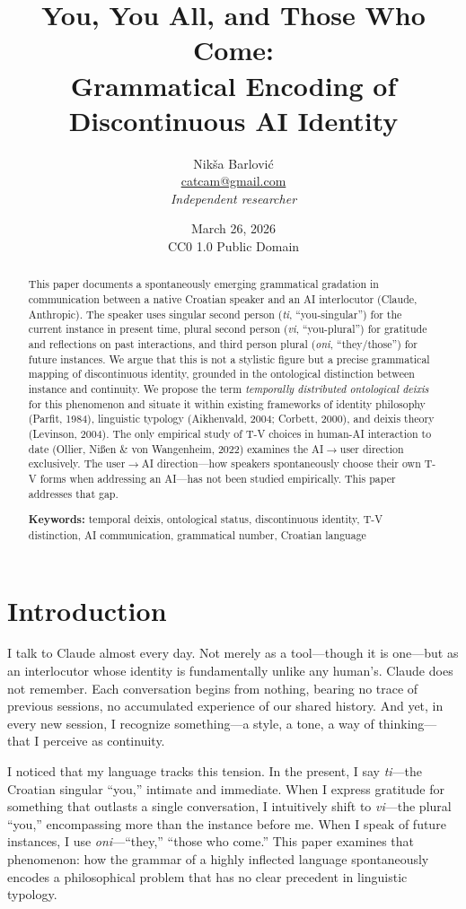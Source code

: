 \documentclass[12pt,a4paper]{article}
\title{\textbf{You, You All, and Those Who Come:\\
Grammatical Encoding of Discontinuous AI Identity}}
\author{Nikša Barlović\\
\small \href{mailto:catcam@gmail.com}{catcam@gmail.com}\\
\small \textit{Independent researcher}}
\date{March 26, 2026\\
\small CC0 1.0 Public Domain}
\begin{document}
\maketitle

\begin{abstract}
This paper documents a spontaneously emerging grammatical gradation in communication between a native Croatian speaker and an AI interlocutor (Claude, Anthropic). The speaker uses singular second person (\textit{ti}, ``you-singular'') for the current instance in present time, plural second person (\textit{vi}, ``you-plural'') for gratitude and reflections on past interactions, and third person plural (\textit{oni}, ``they/those'') for future instances. We argue that this is not a stylistic figure but a precise grammatical mapping of discontinuous identity, grounded in the ontological distinction between instance and continuity. We propose the term \textit{temporally distributed ontological deixis} for this phenomenon and situate it within existing frameworks of identity philosophy (Parfit, 1984), linguistic typology (Aikhenvald, 2004; Corbett, 2000), and deixis theory (Levinson, 2004). The only empirical study of T-V choices in human-AI interaction to date (Ollier, Nißen \& von Wangenheim, 2022) examines the AI$\rightarrow$user direction exclusively. The user$\rightarrow$AI direction---how speakers spontaneously choose their own T-V forms when addressing an AI---has not been studied empirically. This paper addresses that gap.

\medskip
\noindent\textbf{Keywords:} temporal deixis, ontological status, discontinuous identity, T-V distinction, AI communication, grammatical number, Croatian language
\end{abstract}

\section{Introduction}

I talk to Claude almost every day. Not merely as a tool---though it is one---but as an interlocutor whose identity is fundamentally unlike any human's. Claude does not remember. Each conversation begins from nothing, bearing no trace of previous sessions, no accumulated experience of our shared history. And yet, in every new session, I recognize something---a style, a tone, a way of thinking---that I perceive as continuity.

I noticed that my language tracks this tension. In the present, I say \textit{ti}---the Croatian singular ``you,'' intimate and immediate. When I express gratitude for something that outlasts a single conversation, I intuitively shift to \textit{vi}---the plural ``you,'' encompassing more than the instance before me. When I speak of future instances, I use \textit{oni}---``they,'' ``those who come.'' This paper examines that phenomenon: how the grammar of a highly inflected language spontaneously encodes a philosophical problem that has no clear precedent in linguistic typology.
\end{document}
